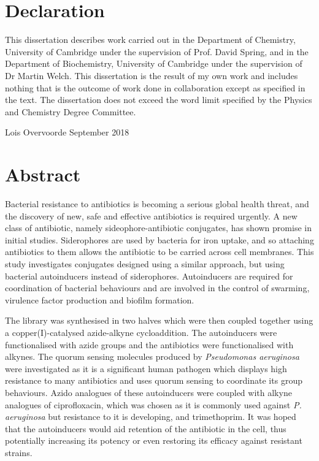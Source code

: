 \section{Declaration}

This dissertation describes work carried out in the Department of Chemistry, University of Cambridge under the supervision of Prof. David Spring, and in the Department of Biochemistry, University of Cambridge under the supervision of Dr Martin Welch. 
This dissertation is the result of my own work and includes nothing that is the outcome of work done in collaboration except as specified in the text. The dissertation does not exceed the word limit specified by the Physics and Chemistry Degree Committee.

\vspace{5cm}



Lois Overvoorde
September 2018
\newpage

\section{Abstract}

Bacterial resistance to antibiotics is becoming a serious global health threat, and the discovery of new, safe and effective antibiotics is required urgently\cite{ResistanceUS,davies2013drugs,ANIE:ANIE201209979}. A new class of antibiotic, namely sideophore-antibiotic conjugates, has shown promise in initial studies\cite{Page2013,Schalk2017}. Siderophores are used by bacteria for iron uptake, and so attaching antibiotics to them allows the antibiotic to be carried across cell membranes. This study investigates conjugates designed using a similar approach, but using bacterial autoinducers\cite{Waters2005} instead of siderophores. Autoinducers are required for coordination of bacterial behaviours and are involved in the control of swarming, virulence factor production and biofilm formation. 


The library was synthesised in two halves which were then coupled together using a copper(I)-catalysed azide-alkyne cycloaddition\cite{Tornoe2002,ANIE:ANIE2596}. The autoinducers were functionalised with azide groups and the antibiotics were functionalised with alkynes. The quorum sensing molecules produced by \textit{Pseudomonas aeruginosa} were investigated as it is a significant human pathogen\cite{Bodey1983} which displays high resistance to many antibiotics\cite{Poole2004} and uses quorum sensing to coordinate its group behaviours\cite{Dubern2008}. Azido analogues of these autoinducers were coupled with alkyne analogues of ciprofloxacin, which was chosen as it is commonly used against \textit{P. aeruginosa}\cite{Macgowan1999} but resistance to it is developing\cite{Su2010}, and trimethoprim. It was hoped that the autoinducers would aid retention of the antibiotic in the cell, thus potentially increasing its potency or even restoring its efficacy against resistant strains.

\newpage